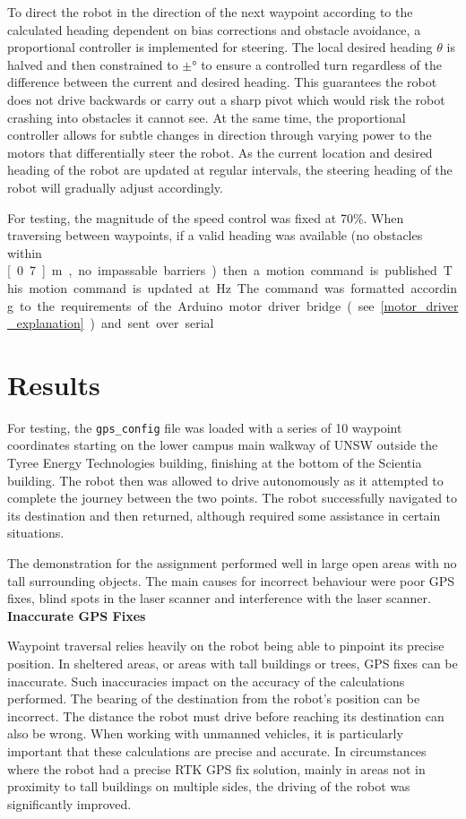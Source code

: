 \documentclass[titlepage,12pt,a4paper]{article}
\begin{document}
To direct the robot in the direction of the next waypoint according to the calculated heading dependent on bias corrections and obstacle avoidance, a proportional controller is implemented for steering. The local desired heading $\theta$ is halved and then constrained to $\pm$\unit[30]{\degree} to ensure a controlled turn regardless of the difference between the current and desired heading. This guarantees the robot does not drive backwards or carry out a sharp pivot which would risk the robot crashing into obstacles it cannot see. At the same time, the proportional controller allows for subtle changes in direction through varying power to the motors that differentially steer the robot. As the current location and desired heading of the robot are updated at regular intervals, the steering heading of the robot will gradually adjust accordingly.

For testing, the magnitude of the speed control was fixed at 70\%. When traversing between waypoints, if a valid heading was available (no obstacles within \unit[0.7]{m}, no impassable barriers) then a motion command is published. This motion command is updated at \unit[10]{Hz}. The command was formatted according to the requirements of the Arduino motor driver bridge (see \ref{motor_driver_explanation}) and sent over serial.

\pagebreak
\section{Results}

For testing, the \verb|gps_config| file was loaded with a series of 10 waypoint coordinates starting on the lower campus main walkway of UNSW outside the Tyree Energy Technologies building, finishing at the bottom of the Scientia building. The robot then was allowed to drive autonomously as it attempted to complete the journey between the two points. The robot successfully navigated to its destination and then returned, although required some assistance in certain situations.

The demonstration for the assignment performed well in large open areas with no tall surrounding objects. The main causes for incorrect behaviour were poor GPS fixes, blind spots in the laser scanner and interference with the laser scanner. \\

\textbf{Inaccurate GPS Fixes}

Waypoint traversal relies heavily on the robot being able to pinpoint its precise position. In sheltered areas, or areas with tall buildings or trees, GPS fixes can be inaccurate. Such inaccuracies impact on the accuracy of the calculations performed. The bearing of the destination from the robot's position can be incorrect. The distance the robot must drive before reaching its destination can also be wrong. When working with unmanned vehicles, it is particularly important that these calculations are precise and accurate. In circumstances where the robot had a precise RTK GPS fix solution, mainly in areas not in proximity to tall buildings on multiple sides, the driving of the robot was significantly improved.\\
\end{document}
